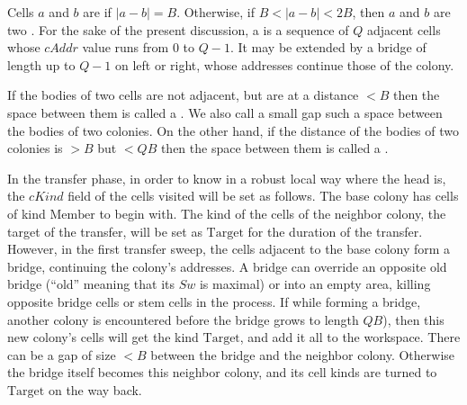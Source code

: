 \documentclass[12pt]{memoir}
\newcommand{\fld}[1]{\ensuremath{\textit{#1}}}
\newcommand{\rul}[1]{\ensuremath{\texttt{\slshape #1\/}}}
\def\B{B}
\newcommand{\cAddr}{\fld{cAddr}}
\newcommand{\cDrift}{\fld{cDrift}}
\newcommand{\cKind}{\fld{cKind}}
\newcommand{\Sweep}{\fld{Sw}}
\newcommand{\cSweep}{\fld{cSw}}
\newcommand{\Last}{\mathrm{Last}}
\newcommand{\Member}{\mathrm{Member}}
\newcommand{\Target}{\mathrm{Target}}
\newcommand{\Alarm}{\rul{Alarm}}
\begin{document}
\begin{definition}\label{def:adjacent}
  Cells \( a \) and \( b \) are  if \( |a-b|=\B \).
  Otherwise, if \( \B < | a- b| < 2\B \), then
  \( a \) and \( b \) are two .
For the sake of the present discussion, a  is a sequence of \( Q \) adjacent
cells whose \( \cAddr \) value runs from \( 0 \) to \( Q-1 \).
It may be extended by a bridge of length up to \( Q-1 \) on left or right,
whose addresses continue those of the colony.

If the bodies of two cells are not adjacent, but are at a distance \( <\B \) then the space
between them is called a .
We also call a small gap such a space between the bodies of two colonies.
On the other hand, if the distance of the bodies of two colonies is \( >\B \) 
but \( <Q\B \) then the space between them is called a .
\end{definition}

In the transfer phase, in order to know in a robust local way where the head is,
the \( \cKind \) field of the cells visited will be set as follows.
The base colony has cells of kind \( \Member \) to begin with.
The kind of the cells of the neighbor colony, the target of the transfer, will be set
as \( \Target \) for the duration of the transfer.
However, in the first transfer sweep, the cells adjacent to the base colony form a
bridge, continuing the colony's addresses.
A bridge can override an opposite old bridge (``old'' meaning 
that its \( \Sweep \) is maximal) or 
into an empty area, killing opposite bridge cells or stem cells in the process.
If while forming a bridge, another colony is encountered before
the bridge grows to length \( Q\B \)), then this new colony's cells will get the 
kind \( \Target \), and add it all to the workspace.
There can be a gap of size \( <\B \) between the bridge and the neighbor colony.
Otherwise the bridge itself becomes this neighbor colony, and its cell kinds are
turned to \( \Target \) on the way back.


\end{document}
